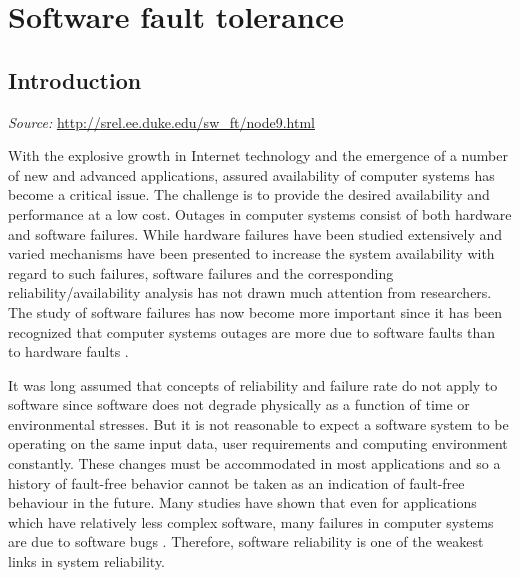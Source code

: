 \documentclass[a4paper, 11pt]{article}
\begin{document}
\section{Software fault tolerance}
\subsection{Introduction}
\textit{Source:} \url{http://srel.ee.duke.edu/sw_ft/node9.html}

With the explosive growth in Internet technology and the emergence of a number of new and advanced applications, assured availability of computer systems has become a critical issue. The challenge is to provide the desired availability and performance at a low cost.
Outages in computer systems consist of both hardware and software failures. While hardware failures have been studied extensively and varied mechanisms have been presented to increase the system availability with regard to such failures, software failures and the corresponding reliability/availability analysis has not drawn much attention from researchers. The study of software failures has now become more important since it has been recognized that computer systems outages are more due to software faults than to hardware faults \citep{gray1991high, sullivan1991software}.

It was long assumed that concepts of reliability and failure rate do not apply to software since software does not degrade physically as a function of time or environmental stresses. But it is not reasonable to expect a software system to be operating on the same input data, user requirements and computing environment constantly. These changes must be accommodated in most applications and so a history of fault-free behavior cannot be taken as an indication of fault-free behaviour in the future. Many studies have shown that even for applications which have relatively less complex software, many failures in computer systems are due to software bugs \citep{pradhan1996fault}. Therefore, software reliability is one of the weakest links in system reliability.
\end{document}
